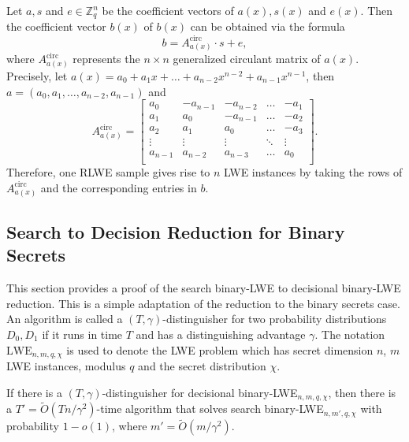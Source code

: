 \documentclass{article}
\begin{document}
    Let \( a, s \) and \( e \in \mathbb{Z}_q^n \) be the coefficient vectors of \( a(x), s(x) \) and \( e(x) \). Then the coefficient vector \( b(x) \) of \( b(x) \) can be obtained via the formula
    \[
    b = A_{a(x)}^{\text{circ}} \cdot s + e,
    \]
    where \( A_{a(x)}^{\text{circ}} \) represents the \( n \times n \) generalized circulant matrix of \( a(x) \). Precisely, let \( a(x) = a_0 + a_1 x + \ldots + a_{n-2} x^{n-2} + a_{n-1} x^{n-1} \), then \( a = (a_0, a_1, \ldots, a_{n-2}, a_{n-1}) \) and 
    \[
    A_{a(x)}^{\text{circ}} =
    \begin{bmatrix}
    a_0 & -a_{n-1} & -a_{n-2} & \ldots & -a_1 \\
    a_1 & a_0 & -a_{n-1} & \ldots & -a_2 \\
    a_2 & a_1 & a_0 & \ldots & -a_3 \\
    \vdots & \vdots & \vdots & \ddots & \vdots \\
    a_{n-1} & a_{n-2} & a_{n-3} & \ldots & a_0 \\
    \end{bmatrix}.
    \]
    Therefore, one RLWE sample gives rise to \( n \) LWE instances by taking the rows of \( A_{a(x)}^{\text{circ}} \) and the corresponding entries in \( b \).
    
    \subsection*{Search to Decision Reduction for Binary Secrets}
    
    This section provides a proof of the search binary-LWE to decisional binary-LWE reduction. This is a simple adaptation of the reduction to the binary secrets case. An algorithm is called a \( (T, \gamma) \)-distinguisher for two probability distributions \( D_0, D_1 \) if it runs in time \( T \) and has a distinguishing advantage \( \gamma \). The notation \( \text{LWE}_{n,m,q,\chi} \) is used to denote the LWE problem which has secret dimension \( n \), \( m \) LWE instances, modulus \( q \) and the secret distribution \( \chi \).
    
    If there is a \( (T, \gamma) \)-distinguisher for decisional binary-LWE$_{n,m,q,\chi}$, then there is a \( T' = \tilde{O}(Tn/\gamma^2) \)-time algorithm that solves search binary-LWE$_{n,m',q,\chi}$ with probability \( 1 - o(1) \), where \( m' = \tilde{O}(m/\gamma^2) \).
\end{document}
